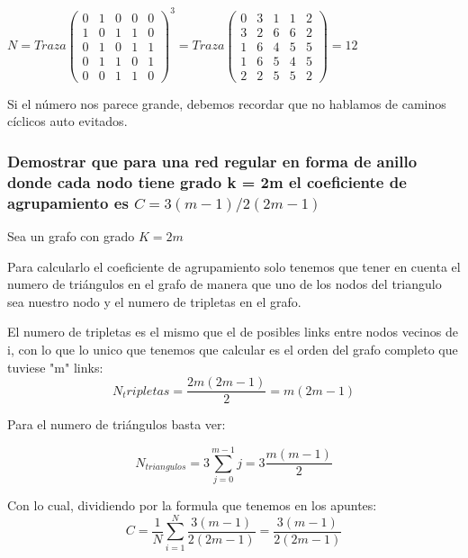 $N=Traza\begin{pmatrix}
	0 & 1 & 0 & 0 & 0 \\ 
	1 & 0 & 1 & 1 & 0 \\ 
	0 & 1 & 0 & 1 & 1 \\ 
	0 & 1 & 1 & 0 & 1 \\ 
	0 & 0 & 1 & 1 & 0
	\end{pmatrix}^3=
	Traza\begin{pmatrix}
	0 & 3 & 1 & 1 & 2 \\ 
	3 & 2 & 6 & 6 & 2 \\ 
	1 & 6 & 4 & 5 & 5 \\ 
	1 & 6 & 5 & 4 & 5 \\ 
	2 & 2 & 5 & 5 & 2
	\end{pmatrix}=12$

Si el número nos parece grande, debemos recordar que no hablamos de caminos cíclicos auto evitados.

\subsubsection{\large Demostrar que para una red regular en forma de anillo donde cada nodo tiene grado k = 2m el coeficiente de agrupamiento es $C = 3(m - 1)/2(2m - 1)$}
Sea un grafo con grado $K=2m$

Para calcularlo el coeficiente de agrupamiento solo tenemos que tener en cuenta el numero de triángulos en el grafo de manera que uno de los nodos del triangulo sea nuestro nodo y el numero de tripletas en el grafo.

El numero de tripletas es el mismo que el de posibles links entre nodos vecinos de i, con lo que lo unico que tenemos que calcular es el orden del grafo completo que tuviese "m" links:
$$N_tripletas=\frac{2m(2m-1)}{2}=m(2m-1)$$

Para el numero de triángulos basta ver:

$$N_{triangulos}=3\sum_{j=0}^{m-1}j=3\frac{m(m-1)}{2}$$

Con lo cual, dividiendo por la formula que tenemos en los apuntes:
$$C=\frac{1}{N}\sum_{i=1}^{N}\frac{3(m - 1)}{2(2m - 1)}=\frac{3(m - 1)}{2(2m - 1)}$$
